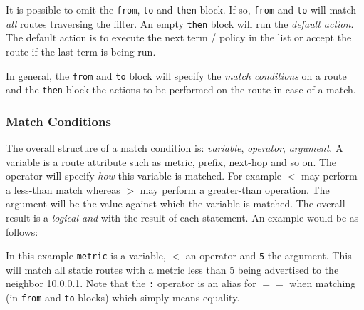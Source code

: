 It is possible to omit the {\tt from}, {\tt to} and {\tt then} block.  If so,
{\tt from} and {\tt to} will match {\em all} routes traversing the filter.  An
empty {\tt then} block will run the {\em default action}.  The default action is
to execute the next term / policy in the list or accept the route if the last
term is being run.

In general, the {\tt from} and {\tt to} block will specify the {\em match
conditions} on a route and the {\tt then} block the actions to be performed on
the route in case of a match.

\subsubsection{Match Conditions}
The overall structure of a match condition is: {\em variable}, {\em operator},
{\em argument}.  A variable is a route attribute such as metric, prefix,
next-hop and so on.  The operator will specify {\em how} this variable is
matched.  For example {\tt $<$} may perform a less-than match whereas {\tt $>$}
may perform a greater-than operation.  The argument will be the value against
which the variable is matched.  The overall result is a {\em logical and} with
the result of each statement. An example would be as follows:

\noindent{}

In this example {\tt metric} is a variable, {\tt $<$} an operator and {\tt 5}
the argument.  This will match all static routes with a metric less than 5 being
advertised to the neighbor 10.0.0.1.  Note that the {\tt :} operator is an alias
for {\tt $==$} when matching (in {\tt from} and {\tt to} blocks) which simply
means equality.

